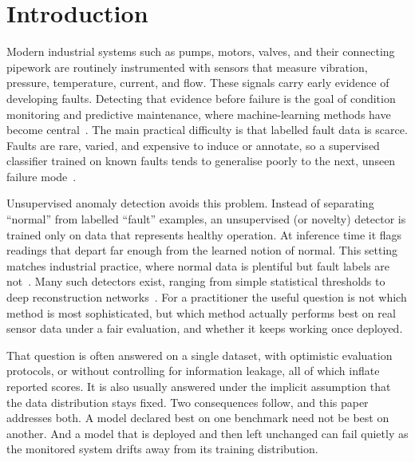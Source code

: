 \documentclass[runningheads]{llncs}
\begin{document}
\begin{abstract}
\end{abstract}

\section{Introduction}
Modern industrial systems such as pumps, motors, valves, and their connecting
pipework are routinely instrumented with sensors that measure vibration,
pressure, temperature, current, and flow. These signals carry early evidence of
developing faults. Detecting that evidence before failure is the goal of
condition monitoring and predictive maintenance, where machine-learning methods
have become central~\cite{rotating2023}. The main practical difficulty is that
labelled fault data is scarce. Faults are rare, varied, and expensive to induce
or annotate, so a supervised classifier trained on known faults tends to
generalise poorly to the next, unseen failure mode~\cite{chandola2009}.

Unsupervised anomaly detection avoids this problem. Instead of separating
``normal'' from labelled ``fault'' examples, an unsupervised (or novelty)
detector is trained only on data that represents healthy operation. At inference
time it flags readings that depart far enough from the learned notion of normal.
This setting matches industrial practice, where normal data is plentiful but
fault labels are not~\cite{belay2023}. Many such detectors exist, ranging from
simple statistical thresholds to deep reconstruction
networks~\cite{chalapathy2019}. For a practitioner the useful question is not
which method is most sophisticated, but which method actually performs best on
real sensor data under a fair evaluation, and whether it keeps working once
deployed.

That question is often answered on a single dataset, with optimistic evaluation
protocols, or without controlling for information leakage, all of which inflate
reported scores. It is also usually answered under the implicit assumption that
the data distribution stays fixed. Two consequences follow, and this paper
addresses both. A model declared best on one benchmark need not be best on
another. And a model that is deployed and then left unchanged can fail quietly as
the monitored system drifts away from its training distribution.
\end{document}
